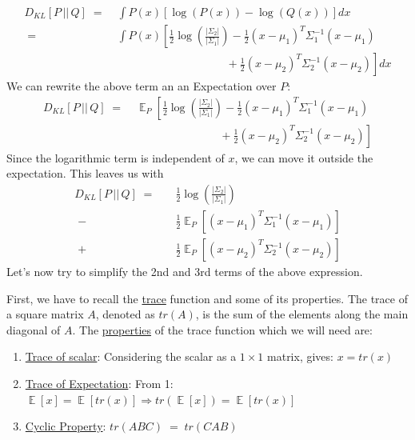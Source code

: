 \documentclass[12pt]{report}
\DeclareMathOperator{\E}{\mathbb{E}}
\begin{document}
\begin{align*}
    D_{KL} \left[ P \,||\, Q \right]
    \;=&\; \int P(x) \left[\log(P(x)) - \log(Q(x)) \right] dx\\
    \;=&\; \int P(x) \left[ \frac{1}{2}\log\left(\frac{|\Sigma_2|}{|\Sigma_1|}\right)
        - \frac{1}{2}(x-\mu_1)^T\Sigma_1^{-1} (x - \mu_1) \right. \\
       &\left.\qquad\qquad\qquad\qquad\quad\;\;\;\,
        + \frac{1}{2}(x-\mu_2)^T\Sigma_2^{-1} (x - \mu_2)\right] dx
\end{align*}
We can rewrite the above term an an Expectation over $P$:
\begin{align*}
    D_{KL} \left[ P \,||\, Q \right]
    \;=&\; \E_P \left[ \frac{1}{2}\log\left(\frac{|\Sigma_2|}{|\Sigma_1|}\right)
        - \frac{1}{2}(x-\mu_1)^T\Sigma_1^{-1} (x - \mu_1) \right. \\
       &\left.\qquad\qquad\qquad\quad\;\;\,
        + \frac{1}{2}(x-\mu_2)^T\Sigma_2^{-1} (x - \mu_2)\right]
\end{align*}
Since the logarithmic term is independent of $x$, we can move it outside the
expectation. This leaves us with
\begin{align}\label{eq:kld_exp}
    D_{KL} \left[ P \,||\, Q \right]
    \;=\quad &\frac{1}{2}\log\left(\frac{|\Sigma_2|}{|\Sigma_1|}\right) \nonumber \\
       \; -\, &\frac{1}{2} \E_P \left[ (x-\mu_1)^T\Sigma_1^{-1} (x - \mu_1) \right]
            \nonumber \\
       \; +\, &\frac{1}{2} \E_P \left[ (x-\mu_2)^T\Sigma_2^{-1} (x - \mu_2) \right]
\end{align}
Let's now try to simplify the 2nd and 3rd terms of the above expression.
\bigskip

\noindent First, we have to recall the
\href{https://en.wikipedia.org/wiki/Trace_(linear_algebra)}{trace}
function and some of its properties. The trace of a square matrix $A$,
denoted as $tr(A)$, is the sum of the elements along the main diagonal of $A$.
The \href{https://en.wikipedia.org/wiki/Trace_(linear_algebra)#Properties}{properties}
of the trace function which we will need are:
\begin{enumerate}
    \item \href{https://math.stackexchange.com/questions/3098841/how-could-a-scalar-
        be-equal-to-the-trace-of-the-same-scalar}{Trace of scalar}:
        Considering the scalar as a $1\times1$ matrix, gives: $x = tr(x)$
    \item \href{https://math.stackexchange.com/questions/2228398/trace-trick-for-
        expectations-of-quadratic-forms}{Trace of Expectation}:
        From 1: $\E[x] = \E[tr(x)] \Rightarrow tr(\E[x]) = \E[tr(x)]$
    \item \href{https://en.wikipedia.org/wiki/Trace_(linear_algebra)#Cyclic_property}
        {Cyclic Property}: $tr(ABC) \;=\; tr(CAB)$
\end{enumerate}
\clearpage
\end{document}
